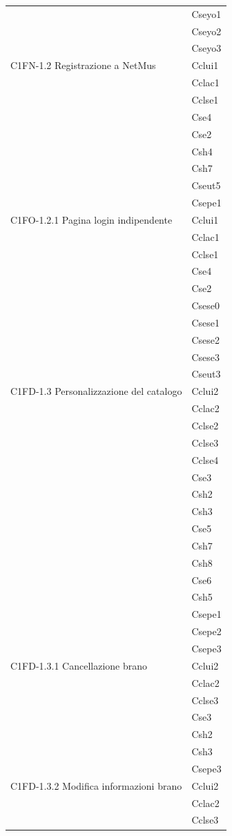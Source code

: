 \begin{footnotesize}
\begin{longtable}[!h]{|l|l|}
& Cseyo1\\
& Cseyo2\\
& Cseyo3\\\hline
C1FN-1.2 Registrazione a NetMus & Cclui1\\
& Cclac1\\
& Cclse1\\
& Cse4\\
& Cse2\\
& Csh4\\
& Csh7\\
& Cseut5\\
& Csepe1\\\hline
C1FO-1.2.1 Pagina login indipendente & Cclui1\\
& Cclac1\\
& Cclse1\\
& Cse4\\
& Cse2\\
& Csese0\\
& Csese1\\
& Csese2\\
& Csese3\\
& Cseut3\\\hline
C1FD-1.3 Personalizzazione del catalogo & Cclui2\\
& Cclac2\\
& Cclse2\\
& Cclse3\\
& Cclse4\\
& Cse3\\
& Csh2\\
& Csh3\\
& Cse5\\
& Csh7\\
& Csh8\\
& Cse6\\
& Csh5\\
& Csepe1\\
& Csepe2\\
& Csepe3\\\hline 
C1FD-1.3.1 Cancellazione brano & Cclui2\\
& Cclac2\\
& Cclse3\\
& Cse3\\
& Csh2\\
& Csh3\\
& Csepe3\\\hline  
C1FD-1.3.2 Modifica informazioni brano & Cclui2\\
& Cclac2\\
& Cclse3\\

\end{longtable}
\end{footnotesize}
